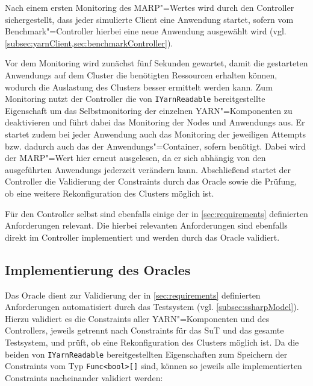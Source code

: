 Nach einem ersten Monitoring des \gls{MARP}"=Wertes wird durch den Controller sichergestellt, dass jeder simulierte Client eine \gls{Anwendung} startet, sofern vom Benchmark"=Controller hierbei eine neue \gls{Anwendung} ausgewählt wird (vgl. \cref{subsec:yarnClient,sec:benchmarkController}).

Vor dem Monitoring wird zunächst fünf Sekunden gewartet, damit die gestarteten \glspl{Anwendung} auf dem Cluster die benötigten Ressourcen erhalten können, wodurch die Auslastung des Clusters besser ermittelt werden kann.
Zum Monitoring nutzt der Controller die von \texttt{IYarnReadable} bereitgestellte Eigenschaft um das Selbstmonitoring der einzelnen \gls{YARN}"=Komponenten zu deaktivieren und führt dabei das Monitoring der Nodes und \glspl{Anwendung} aus.
Er startet zudem bei jeder \gls{Anwendung} auch das Monitoring der jeweiligen \glspl{Attempt} bzw. dadurch auch das der Anwendungs"=Container, sofern benötigt.
Dabei wird der \gls{MARP}"=Wert hier erneut ausgelesen, da er sich abhängig von den ausgeführten \glspl{Anwendung} jederzeit verändern kann.
Abschließend startet der Controller die Validierung der Constraints durch das Oracle sowie die Prüfung, ob eine weitere Rekonfiguration des Clusters möglich ist.

Für den Controller selbst sind ebenfalls einige der in \cref{sec:requirements} definierten Anforderungen relevant.
Die hierbei relevanten Anforderungen sind ebenfalls direkt im Controller implementiert und werden durch das Oracle validiert.

\subsection{Implementierung des Oracles}
\label{subsec:oracleImpl}

Das Oracle dient zur Validierung der  in \cref{sec:requirements} definierten Anforderungen automatisiert durch das Testsystem (vgl. \cref{subsec:ssharpModel}).
Hierzu validiert es die Constraints aller \gls{YARN}"=Komponenten und des Controllers, jeweils getrennt nach Constraints für das \gls{SuT} und das gesamte Testsystem, und prüft, ob eine Rekonfiguration des Clusters möglich ist.
Da die beiden von \texttt{IYarnReadable} bereitgestellten Eigenschaften zum Speichern der Constraints vom Typ \texttt{Func<bool>[]} sind, können so jeweils alle implementierten Constraints nacheinander validiert werden:

